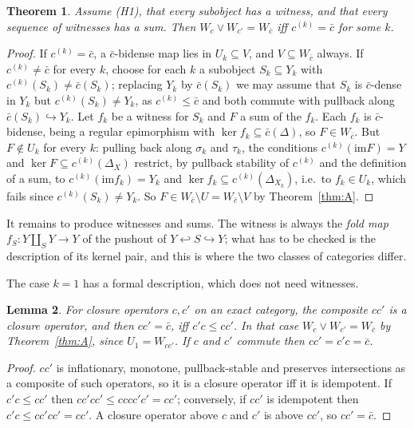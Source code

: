 \documentclass[11pt]{amsart}
\newtheorem{thm}{Theorem}[section]
\newtheorem{lem}[thm]{Lemma}
\theoremstyle{definition}
\newcommand{\im}{\mathrm{im}}
\begin{document}
\begin{thm}\label{thm:Bax}
Assume (H1), that every subobject has a witness, and that every sequence
of witnesses has a sum. Then $W_c\vee W_{c'}=W_{\bar c}$ iff $c^{(k)}=\bar c$
for some $k$.
\end{thm}
\begin{proof}
If $c^{(k)}=\bar c$, a $\bar c$-bidense map lies in $U_k\subseteq V$, and
$V\subseteq W_{\bar c}$ always. If $c^{(k)}\ne\bar c$ for every $k$, choose
for each $k$ a subobject $S_k\subseteq Y_k$ with $c^{(k)}(S_k)\ne\bar c(S_k)$;
replacing $Y_k$ by $\bar c(S_k)$ we may assume that $S_k$ is $\bar c$-dense in
$Y_k$ but $c^{(k)}(S_k)\ne Y_k$, as $c^{(k)}\le\bar c$ and both commute with
pullback along $\bar c(S_k)\hookrightarrow Y_k$. Let $f_k$ be a witness for
$S_k$ and $F$ a sum of the $f_k$. Each $f_k$ is $\bar c$-bidense, being a
regular epimorphism with $\ker f_k\subseteq\bar c(\Delta)$, so $F\in W_{\bar c}$.
But $F\notin U_k$ for every $k$: pulling back along $\sigma_k$ and $\tau_k$,
the conditions $c^{(k)}(\im F)=Y$ and $\ker F\subseteq c^{(k)}(\Delta_X)$
restrict, by pullback stability of $c^{(k)}$ and the definition of a sum,
to $c^{(k)}(\im f_k)=Y_k$ and $\ker f_k\subseteq c^{(k)}(\Delta_{X_k})$,
i.e.\ to $f_k\in U_k$, which fails since $c^{(k)}(S_k)\ne Y_k$. So
$F\in W_{\bar c}\setminus U=W_{\bar c}\setminus V$ by Theorem~\ref{thm:A}.
\end{proof}

It remains to produce witnesses and sums. The witness is always the
\emph{fold map} $f_S\colon Y\amalg_SY\to Y$ of the pushout of
$Y\hookleftarrow S\hookrightarrow Y$; what has to be checked is the description
of its kernel pair, and this is where the two classes of categories differ.

The case $k=1$ has a formal description, which does not need witnesses.

\begin{lem}\label{lem:k1}
For closure operators $c,c'$ on an exact category, the composite $cc'$ is a
closure operator, and then $cc'=\bar c$, iff $c'c\le cc'$. In that case
$W_c\vee W_{c'}=W_{\bar c}$ by Theorem~\ref{thm:A}, since $U_1=W_{cc'}$. If
$c$ and $c'$ commute then $cc'=c'c=\bar c$.
\end{lem}
\begin{proof}
$cc'$ is inflationary, monotone, pullback-stable and preserves
intersections as a composite of such operators, so it is a closure
operator iff it is idempotent. If $c'c\le cc'$ then $cc'cc'\le cccc'c'=
cc'$; conversely, if $cc'$ is idempotent then $c'c\le cc'cc'=cc'$. A closure
operator above $c$ and $c'$ is above $cc'$, so $cc'=\bar c$.
\end{proof}
\end{document}
